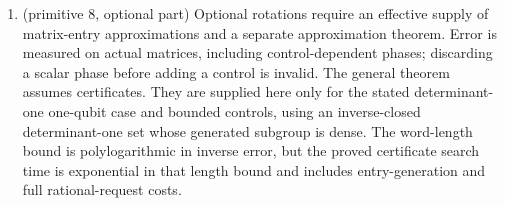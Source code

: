 \begin{enumerate}
\item (primitive 8, optional part) Optional rotations require an effective supply of matrix-entry approximations and a separate approximation theorem. Error is measured on actual matrices, including control-dependent phases; discarding a scalar phase before adding a control is invalid. The general theorem assumes certificates. They are supplied here only for the stated determinant-one one-qubit case and bounded controls, using an inverse-closed determinant-one set whose generated subgroup is dense. The word-length bound is polylogarithmic in inverse error, but the proved certificate search time is exponential in that length bound and includes entry-generation and full rational-request costs.
\end{enumerate}
